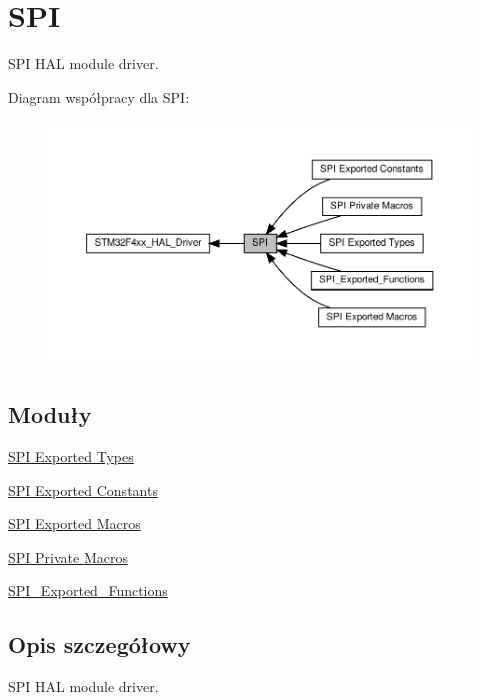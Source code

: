 \hypertarget{group___s_p_i}{}\section{S\+PI}
\label{group___s_p_i}


S\+PI H\+AL module driver.  


Diagram współpracy dla S\+PI\+:\nopagebreak
\begin{figure}[H]
\begin{center}
\leavevmode
\includegraphics[width=350pt]{group___s_p_i}
\end{center}
\end{figure}
\subsection*{Moduły}
\begin{DoxyCompactItemize}
\item 
\hyperlink{group___s_p_i___exported___types}{S\+P\+I Exported Types}
\item 
\hyperlink{group___s_p_i___exported___constants}{S\+P\+I Exported Constants}
\item 
\hyperlink{group___s_p_i___exported___macros}{S\+P\+I Exported Macros}
\item 
\hyperlink{group___s_p_i___private___macros}{S\+P\+I Private Macros}
\item 
\hyperlink{group___s_p_i___exported___functions}{S\+P\+I\+\_\+\+Exported\+\_\+\+Functions}
\end{DoxyCompactItemize}


\subsection{Opis szczegółowy}
S\+PI H\+AL module driver. 

